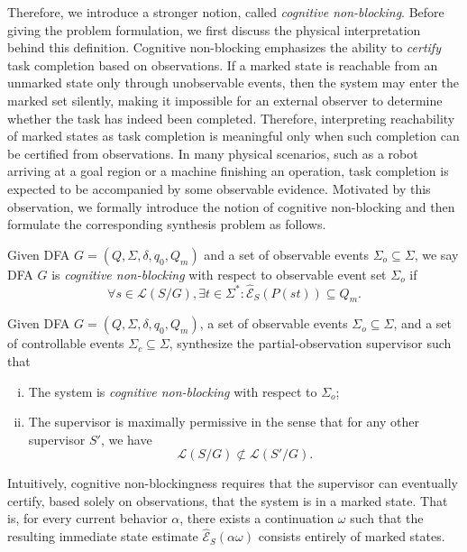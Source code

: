 \documentclass[final,5p,times,twocolumn,authoryear]{elsarticle}
\begin{document}
Therefore, we introduce a stronger notion, called \emph{cognitive non-blocking}.
Before giving the problem formulation, we first discuss the physical interpretation behind this definition.
Cognitive non-blocking emphasizes the ability to \emph{certify} task completion based on observations.
%
If a marked state is reachable from an unmarked state only through unobservable events, then the system may enter the marked set silently, making it impossible for an external observer to determine whether the task has indeed been completed.
Therefore, interpreting reachability of marked states as task completion is meaningful only when such completion can be certified from observations.
% 
In many physical scenarios, such as a robot arriving at a goal region or a machine finishing an operation, task completion is expected to be accompanied by some observable evidence.
%
Motivated by this observation, we formally introduce the notion of cognitive non-blocking and then formulate the corresponding synthesis problem as follows.
%
\begin{definition}%
    \label{def:cnb}
    Given DFA $G = (Q, \Sigma, \delta, q_0, Q_m)$ and a set of observable events $\Sigma_o \subseteq \Sigma$, we say DFA $G$ is \textit{cognitive non-blocking} with respect to observable event set $\Sigma_o$ if
    \begin{equation}\label{eq:cnb_1}
    \forall s \in \mathcal{L}(S/G), \exists t \in \Sigma^* : \hat{\mathcal{E}}_S(P (st)) \subseteq Q_m.
    \end{equation}
\end{definition}
%
\begin{problem}%
    \label{prob:cnb}
    Given DFA $G = (Q, \Sigma, \delta, q_0, Q_m)$, a set of observable events $\Sigma_o \subseteq \Sigma$, and a set of controllable events $\Sigma_c \subseteq \Sigma$, synthesize the partial-observation supervisor such that
    \begin{enumerate}[(i)]
        \item The system is \textit{cognitive non-blocking} with respect to  $\Sigma_o$;
        \item The supervisor is maximally permissive in the sense that for any other supervisor $S'$, we have
        $$
            \mathcal{L}(S/G) \not \subset \mathcal{L}(S'/G).
        $$
    \end{enumerate}
\end{problem}
%
Intuitively, cognitive non-blockingness requires that the supervisor can eventually certify, based solely on observations, that the system is in a marked state.
That is, for every current behavior $\alpha$, there exists a continuation $\omega$ such that the resulting immediate state estimate $\hat{\mathcal{E}}_S(\alpha\omega)$ consists entirely of marked states.
%
\end{document}
